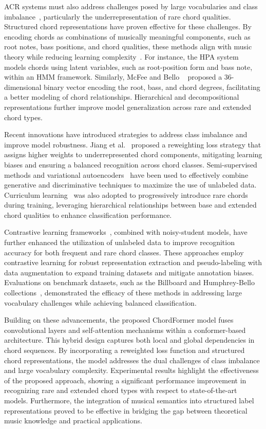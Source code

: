 ACR systems must also address challenges posed by large vocabularies and class imbalance~\cite{pauwels2019acr}, particularly the underrepresentation of rare chord qualities. Structured chord representations have proven effective for these challenges. By encoding chords as combinations of musically meaningful components, such as root notes, bass positions, and chord qualities, these methods align with music theory while reducing learning complexity~\cite{mcfee2017structured}. For instance, the HPA system~\cite{ni2012end} models chords using latent variables, such as root-position form and bass note, within an HMM framework. Similarly, McFee and Bello ~\cite{mcfee2017structured} proposed a 36-dimensional binary vector encoding the root, bass, and chord degrees, facilitating a better modeling of chord relationships. Hierarchical and decompositional representations further improve model generalization across rare and extended chord types.

Recent innovations have introduced strategies to address class imbalance and improve model robustness. Jiang et al.~\cite{jiang2019large} proposed a reweighting loss strategy that assigns higher weights to underrepresented chord components, mitigating learning biases and ensuring a balanced recognition across chord classes. Semi-supervised methods and variational autoencoders~\cite{wu2020semi} have been used to effectively combine generative and discriminative techniques to maximize the use of unlabeled data. Curriculum learning~\cite{rowe2021curriculum} was also adopted to progressively introduce rare chords during training, leveraging hierarchical relationships between base and extended chord qualities to enhance classification performance.

Contrastive learning frameworks~\cite{li2024large}, combined with noisy-student models, have further enhanced the utilization of unlabeled data to improve recognition accuracy for both frequent and rare chord classes. These approaches employ contrastive learning for robust representation extraction and pseudo-labeling with data augmentation to expand training datasets and mitigate annotation biases. Evaluations on benchmark datasets, such as the Billboard and Humphrey-Bello collections~\cite{mcfee2017structured, humphrey2015four}, demonstrated the efficacy of these methods in addressing large vocabulary challenges while achieving balanced classification.

Building on these advancements, the proposed ChordFormer model fuses convolutional layers and self-attention mechanisms within a conformer-based architecture. This hybrid design captures both local and global dependencies in chord sequences. By incorporating a reweighted loss function and structured chord representations, the model addresses the dual challenges of class imbalance and large vocabulary complexity. Experimental results highlight the effectiveness of the proposed approach, showing a significant performance improvement in recognizing rare and extended chord types  with respect to state-of-the-art models. Furthermore, the integration of musical semantics into structured label representations proved to be effective in bridging the gap between theoretical music knowledge and practical applications.


